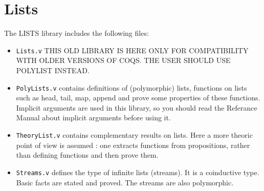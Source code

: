 \section{Lists}\label{Lists}

The LISTS library includes the following files:

\begin{itemize}

\item {\tt Lists.v} THIS OLD LIBRARY IS HERE ONLY FOR COMPATIBILITY
  WITH OLDER VERSIONS OF COQS. THE USER SHOULD USE POLYLIST INSTEAD.

\item {\tt PolyLists.v} contains definitions of (polymorphic) lists, 
  functions on lists such as head, tail, map, append and prove some
  properties of these functions. Implicit arguments are used in this
  library, so you should read the Referance Manual about implicit
  arguments before using it.

\item {\tt TheoryList.v} contains complementary results on lists. Here
  a more theoric point of view is assumed : one extracts functions
  from propositions, rather than defining functions and then prove them.

\item {\tt Streams.v} defines the type of infinite lists (streams). It is a
  coinductive type. Basic facts are stated and proved. The streams are
  also polymorphic.

\end{itemize}
